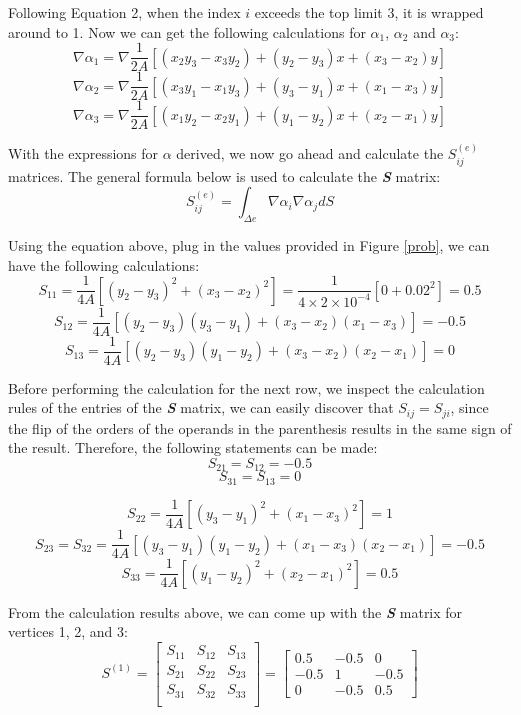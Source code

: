 \documentclass[a4paper,titlepage]{article}
\begin{document}
		Following Equation 2, when the index $i$ exceeds the top limit 3, it is wrapped around to 1. Now we can get the following calculations for $\alpha_1$, $\alpha_2$ and $\alpha_3$:
		$$
			\nabla \alpha_1 = \nabla \frac{1}{2A}[(x_2y_3-x_3y_2) + (y_2-y_3)x+(x_3-x_2)y]
		$$
		$$
			\nabla \alpha_2 = \nabla \frac{1}{2A}[(x_3y_1-x_1y_3) + (y_3-y_1)x+(x_1-x_3)y]
		$$
		$$
			\nabla \alpha_3 = \nabla \frac{1}{2A}[(x_1y_2-x_2y_1) + (y_1-y_2)x+(x_2-x_1)y]
		$$
		
		With the expressions for $\alpha$ derived, we now go ahead and calculate the \textbf{$S_{ij}^{(e)}$} matrices. The general formula below is used to calculate the \textbf{\textit{S}} matrix:
		\begin{equation}
			S^{(e)}_{ij} = \int_{\Delta e} \nabla \alpha_i \nabla \alpha_j dS
		\end{equation}
		
		Using the equation above, plug in the values provided in Figure \ref{prob}, we can have the following calculations:
		$$
			S_{11} = \frac{1}{4A}[(y_2 - y_3)^2 + (x_3 - x_2)^2] = \frac{1}{4 \times 2 \times 10^{-4}}[0 + 0.02^2] = 0.5
		$$
		$$
			S_{12} = \frac{1}{4A}[(y_2 - y_3)(y_3 - y_1) + (x_3 - x_2)(x_1 - x_3)] = -0.5
		$$
		$$
			S_{13} = \frac{1}{4A}[(y_2 - y_3)(y_1 - y_2) + (x_3 - x_2)(x_2 - x_1)] = 0
		$$
		
		Before performing the calculation for the next row, we inspect the calculation rules of the entries of the \textbf{\textit{S}} matrix, we can easily discover that $S_{ij} = S_{ji}$, since the flip of the orders of the operands in the parenthesis results in the same sign of the result. Therefore, the following statements can be made:
		$$
			S_{21} = S_{12} = -0.5
		$$
		$$
			S_{31} = S_{13} = 0
		$$
		
		$$
			S_{22} = \frac{1}{4A}[(y_3 - y_1)^2 + (x_1 - x_3)^2] = 1
		$$
		$$
			S_{23} = S_{32} = \frac{1}{4A}[(y_3 - y_1)(y_1 - y_2) + (x_1 - x_3)(x_2 - x_1)] = -0.5
		$$
		$$
			S_{33} = \frac{1}{4A}[(y_1 - y_2)^2 + (x_2 - x_1)^2] = 0.5
		$$
		
		From the calculation results above, we can come up with the \textbf{\textit{S}} matrix for vertices 1, 2, and 3:
		$$
			S^{(1)} = \begin{bmatrix}
				S_{11} & S_{12} & S_{13}\\
				S_{21} & S_{22} & S_{23} \\
				S_{31} & S_{32} & S_{33} \\
			\end{bmatrix} = 
			\begin{bmatrix}
				0.5 & -0.5 & 0\\
				-0.5 & 1 & -0.5 \\
				0 & -0.5 & 0.5
			\end{bmatrix}
		$$
		
\end{document}
